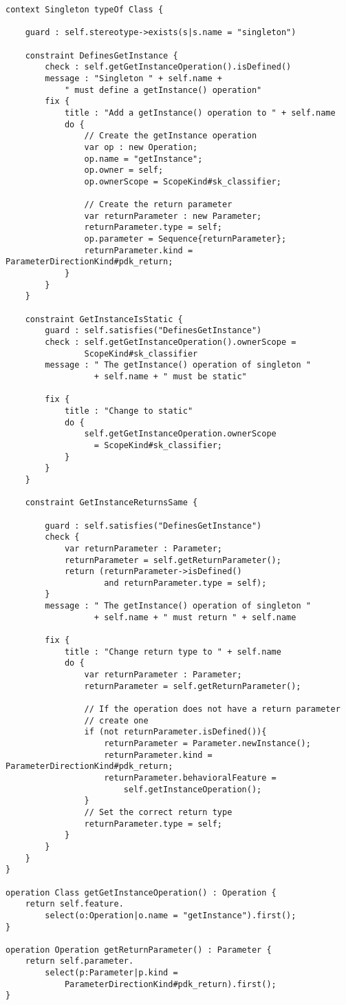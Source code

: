 \begin{lstlisting}[float=tbp, caption=EVL Module for Validating Singletons, label=lst:CaseStudy, language=EVL]
context Singleton typeOf Class {
	
	guard : self.stereotype->exists(s|s.name = "singleton")
	
	constraint DefinesGetInstance {
		check : self.getGetInstanceOperation().isDefined()
		message : "Singleton " + self.name + 
			" must define a getInstance() operation"
		fix {
			title : "Add a getInstance() operation to " + self.name
			do {
				// Create the getInstance operation
				var op : new Operation;
				op.name = "getInstance";
				op.owner = self;
				op.ownerScope = ScopeKind#sk_classifier;
				
				// Create the return parameter
				var returnParameter : new Parameter;
				returnParameter.type = self;
				op.parameter = Sequence{returnParameter};
				returnParameter.kind = ParameterDirectionKind#pdk_return;
			}
		}
	}
	
	constraint GetInstanceIsStatic {
		guard : self.satisfies("DefinesGetInstance")
		check : self.getGetInstanceOperation().ownerScope = 
		        ScopeKind#sk_classifier
		message : " The getInstance() operation of singleton " 
		          + self.name + " must be static"
	
		fix {
			title : "Change to static"
			do {
				self.getGetInstanceOperation.ownerScope 
				  = ScopeKind#sk_classifier;
			}
		}
	}
	
	constraint GetInstanceReturnsSame {
	
		guard : self.satisfies("DefinesGetInstance")
		check {
			var returnParameter : Parameter;
			returnParameter = self.getReturnParameter();
			return (returnParameter->isDefined() 
			        and returnParameter.type = self);
		}
		message : " The getInstance() operation of singleton " 
		          + self.name + " must return " + self.name
			
		fix {
			title : "Change return type to " + self.name
			do {
				var returnParameter : Parameter;
				returnParameter = self.getReturnParameter();
				
				// If the operation does not have a return parameter
				// create one
				if (not returnParameter.isDefined()){
					returnParameter = Parameter.newInstance();
					returnParameter.kind = ParameterDirectionKind#pdk_return;
					returnParameter.behavioralFeature = 
						self.getInstanceOperation();
				}
				// Set the correct return type
				returnParameter.type = self;
			}
		}
	}
}

operation Class getGetInstanceOperation() : Operation {
	return self.feature.
		select(o:Operation|o.name = "getInstance").first();
}

operation Operation getReturnParameter() : Parameter {
	return self.parameter.
		select(p:Parameter|p.kind = 
			ParameterDirectionKind#pdk_return).first();
}
\end{lstlisting}
